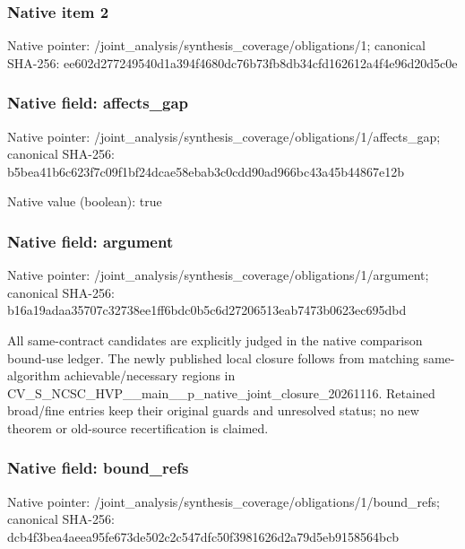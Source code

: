 \documentclass[10pt,a4paper]{article}
\begin{document}
\subsubsection{Native item 2}
Native pointer: /joint\_\allowbreak{}analysis/synthesis\_\allowbreak{}coverage/obligations/1; canonical SHA-256: ee602d277249540d1a394f4680dc76b73fb8db34cfd162612a4f4e96d20d5c0e

\subsubsection{Native field: affects\_\allowbreak{}gap}
Native pointer: /joint\_\allowbreak{}analysis/synthesis\_\allowbreak{}coverage/obligations/1/affects\_\allowbreak{}gap; canonical SHA-256: b5bea41b6c623f7c09f1bf24dcae58ebab3c0cdd90ad966bc43a45b44867e12b

Native value (boolean): true

\subsubsection{Native field: argument}
Native pointer: /joint\_\allowbreak{}analysis/synthesis\_\allowbreak{}coverage/obligations/1/argument; canonical SHA-256: b16a19adaa35707c32738ee1ff6bdc0b5c6d27206513eab7473b0623ec695dbd

\begingroup\raggedright\sloppy All same-contract candidates are explicitly judged in the native comparison bound-use ledger. The newly published local closure follows from matching same-algorithm achievable/\allowbreak{}necessary regions in CV\_\allowbreak{}S\_\allowbreak{}NCSC\_\allowbreak{}HVP\_\allowbreak{}\_\allowbreak{}main\_\allowbreak{}\_\allowbreak{}p\_\allowbreak{}native\_\allowbreak{}joint\_\allowbreak{}closure\_\allowbreak{}20261116. Retained broad/\allowbreak{}fine entries keep their original guards and unresolved status;\allowbreak{} no new theorem or old-source recertification is claimed.\par\endgroup

\subsubsection{Native field: bound\_\allowbreak{}refs}
Native pointer: /joint\_\allowbreak{}analysis/synthesis\_\allowbreak{}coverage/obligations/1/bound\_\allowbreak{}refs; canonical SHA-256: dcb4f3bea4aeea95fe673de502c2c547dfc50f3981626d2a79d5eb9158564bcb
\end{document}
